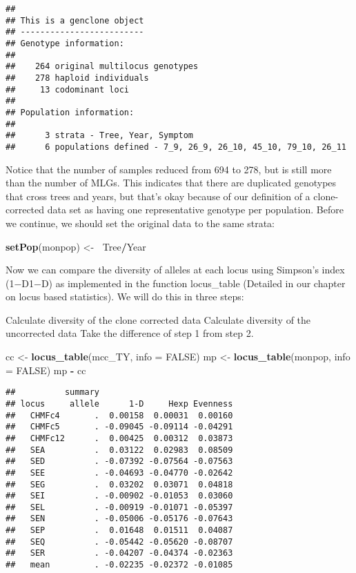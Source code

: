 \documentclass[12pt,]{krantz}
\newenvironment{Shaded}{\begin{snugshade}}{\end{snugshade}}
\newcommand{\KeywordTok}[1]{\textcolor[rgb]{0.27,0.27,0.27}{\textbf{#1}}}
\newcommand{\DataTypeTok}[1]{\textcolor[rgb]{0.27,0.27,0.27}{#1}}
\newcommand{\StringTok}[1]{\textcolor[rgb]{0.5,0.5,0.5}{#1}}
\newcommand{\OtherTok}[1]{\textcolor[rgb]{0.56,0.35,0.01}{#1}}
\newcommand{\OperatorTok}[1]{\textcolor[rgb]{0.81,0.36,0.00}{\textbf{#1}}}
\newcommand{\ErrorTok}[1]{\textcolor[rgb]{0.64,0.00,0.00}{\textbf{#1}}}
\newcommand{\NormalTok}[1]{#1}
\theoremstyle{definition}
\theoremstyle{definition}
\theoremstyle{definition}
\theoremstyle{remark}
\begin{document}
\begin{verbatim}
## 
## This is a genclone object
## -------------------------
## Genotype information:
## 
##    264 original multilocus genotypes 
##    278 haploid individuals
##     13 codominant loci
## 
## Population information:
## 
##      3 strata - Tree, Year, Symptom
##      6 populations defined - 7_9, 26_9, 26_10, 45_10, 79_10, 26_11
\end{verbatim}

Notice that the number of samples reduced from 694 to 278, but is still
more than the number of MLGs. This indicates that there are duplicated
genotypes that cross trees and years, but that's okay because of our
definition of a clone-corrected data set as having one representative
genotype per population. Before we continue, we should set the original
data to the same strata:

\begin{Shaded}
\begin{Highlighting}[]
\KeywordTok{setPop}\NormalTok{(monpop) <-}\StringTok{ }\ErrorTok{~}\NormalTok{Tree}\OperatorTok{/}\NormalTok{Year}
\end{Highlighting}
\end{Shaded}

Now we can compare the diversity of alleles at each locus using
Simpson's index (1−D1−D) as implemented in the function locus\_table
(Detailed in our chapter on locus based statistics). We will do this in
three steps:

Calculate diversity of the clone corrected data Calculate diversity of
the uncorrected data Take the difference of step 1 from step 2.

\begin{Shaded}
\begin{Highlighting}[]
\NormalTok{cc <-}\StringTok{ }\KeywordTok{locus_table}\NormalTok{(mcc_TY, }\DataTypeTok{info =} \OtherTok{FALSE}\NormalTok{)}
\NormalTok{mp <-}\StringTok{ }\KeywordTok{locus_table}\NormalTok{(monpop, }\DataTypeTok{info =} \OtherTok{FALSE}\NormalTok{)}
\NormalTok{mp }\OperatorTok{-}\StringTok{ }\NormalTok{cc}
\end{Highlighting}
\end{Shaded}

\begin{verbatim}
##          summary
## locus     allele      1-D     Hexp Evenness
##   CHMFc4       .  0.00158  0.00031  0.00160
##   CHMFc5       . -0.09045 -0.09114 -0.04291
##   CHMFc12      .  0.00425  0.00312  0.03873
##   SEA          .  0.03122  0.02983  0.08509
##   SED          . -0.07392 -0.07564 -0.07563
##   SEE          . -0.04693 -0.04770 -0.02642
##   SEG          .  0.03202  0.03071  0.04818
##   SEI          . -0.00902 -0.01053  0.03060
##   SEL          . -0.00919 -0.01071 -0.05397
##   SEN          . -0.05006 -0.05176 -0.07643
##   SEP          .  0.01648  0.01511  0.04087
##   SEQ          . -0.05442 -0.05620 -0.08707
##   SER          . -0.04207 -0.04374 -0.02363
##   mean         . -0.02235 -0.02372 -0.01085
\end{verbatim}
\end{document}
